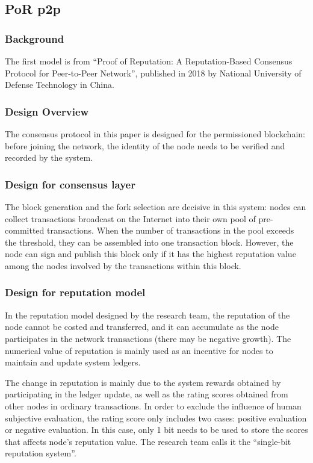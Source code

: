 \documentclass[doublespacing]{bmcart}
\begin{document}
\begin{CJK*}{UTF8}{gbsn}
	\subsection{PoR p2p} 
	\subsubsection*{Background} 
	The first model is from ``Proof of Reputation: A Reputation-Based Consensus Protocol for Peer-to-Peer Network'', published in 2018 by National University of Defense Technology in China. 
	\subsubsection*{Design Overview} 
	The consensus protocol in this paper is designed for the permissioned blockchain: before joining the network, the identity of the node needs to be verified and recorded by the system.
		\subsubsection*{Design for consensus layer}  
	The block generation and the fork selection are decisive in this system: nodes can collect transactions broadcast on the Internet into their own pool of pre-committed transactions. When the number of transactions in the pool exceeds the threshold, they can be assembled into one transaction block. However, the node can sign and publish this block only if it has the highest reputation value among the nodes involved by the transactions within this block.
	\subsubsection*{Design for reputation model} 
	In the reputation model designed by the research team, the reputation of the node cannot be costed and transferred, and it can accumulate as the node participates in the network transactions (there may be negative growth). The numerical value of reputation is mainly used as an incentive for nodes to maintain and update system ledgers.
	 
	The change in reputation is mainly due to the system rewards obtained by participating in the ledger update, as well as the rating scores obtained from other nodes in ordinary transactions. In order to exclude the influence of human subjective evaluation, the rating score only includes two cases: positive evaluation or negative evaluation. In this case, only 1 bit needs to be used to store the scores that affects node’s reputation value. The research team calls it the ``single-bit reputation system''.
	

\end{CJK*}
\end{document}
